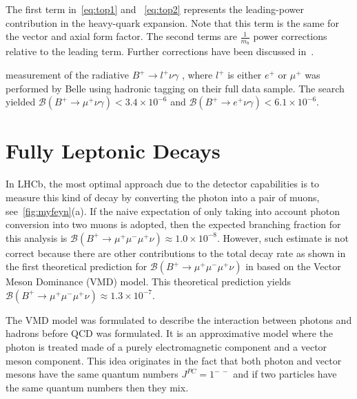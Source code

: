 The first term in~\autoref{eq:top1} and ~\autoref{eq:top2} represents the leading-power contribution in the heavy-quark expansion. Note that this term
is the same for the vector and axial form factor. The second terms are $\frac{1}{m_{b}}$ power corrections relative to the leading term. Further corrections have been discussed in~\cite{Wang:2016beq}.



\DIFdelbegin {}\DIFdelend \DIFaddbegin {}\DIFaddend measurement of the radiative $B^{+} \rightarrow l^{+} \nu \gamma$ \DIFaddbegin {}\DIFaddend , where $l^{+}$ is either $e^{+}$ or $\mu^{+}$ was performed by Belle using hadronic tagging on their full data sample\cite{Heller:2015vvm}. The search yielded $\mathcal{B}(B^{+}\rightarrow \mu^{+} \nu \gamma) < 3.4\times 10^{-6}$ and $\mathcal{B}(B^{+}\rightarrow e^{+} \nu \gamma) < 6.1\times 10^{-6}$.



\section{Fully Leptonic  Decays}
\label{mydecay}

In LHCb, the most optimal approach due to the detector capabilities is to measure this kind of decay by converting the photon into a pair of muons, see~\autoref{fig:myfeyn}(a). If the naive expectation of only taking into account photon conversion into two muons is adopted, then the expected branching fraction for this analysis is $\mathcal{B}(B^{+}\rightarrow \mu^{+} \mu^{-} \mu^{+} \nu) \approx 1.0\times 10^{-8}$. However, such \DIFaddbegin {}\DIFaddend estimate is not correct because there are other contributions to the total decay rate as shown in the first theoretical prediction for $\mathcal{B}(B^{+}\rightarrow \mu^{+} \mu^{-} \mu^{+} \nu)$ in \cite{Danilina:2018uzr} based on the Vector Meson Dominance (VMD) model. This theoretical prediction yields $\mathcal{B}(B^{+} \rightarrow \mu^{+} \mu^{-} \mu^{+} \nu) \approx 1.3\times 10^{-7}$.%

 The VMD model was formulated to describe the interaction between photons and hadrons before \gls{QCD} was formulated. It is an approximative model where the photon is treated \DIFdelbegin {}\DIFdelend \DIFaddbegin {}\DIFaddend made of a purely electromagnetic component and a vector meson component. This idea originates in the fact that both photon and vector mesons have the same quantum numbers $J^{PC} = 1^{-\ -}$ and if two particles have the same quantum numbers then they mix. %

